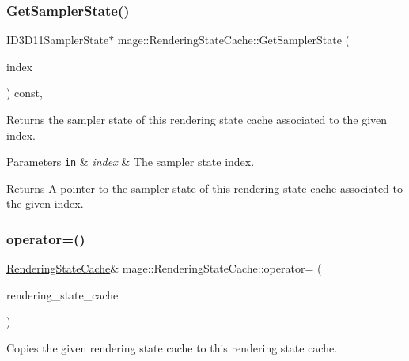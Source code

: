 \subsubsection{\texorpdfstring{Get\+Sampler\+State()}{GetSamplerState()}}
{\footnotesize\ttfamily I\+D3\+D11\+Sampler\+State$\ast$ mage\+::\+Rendering\+State\+Cache\+::\+Get\+Sampler\+State (\begin{DoxyParamCaption}\item[{\hyperlink{structmage_1_1_rendering_state_cache_a4e1d4796699929e0618ff54621910770}{Sampler\+State\+Index}}]{index }\end{DoxyParamCaption}) const\hspace{0.3cm}{\ttfamily [private]}, {\ttfamily [noexcept]}}

Returns the sampler state of this rendering state cache associated to the given index.


\begin{DoxyParams}[1]{Parameters}
\mbox{\tt in}  & {\em index} & The sampler state index. \\
\hline
\end{DoxyParams}
\begin{DoxyReturn}{Returns}
A pointer to the sampler state of this rendering state cache associated to the given index. 
\end{DoxyReturn}
\hypertarget{structmage_1_1_rendering_state_cache_a9534ceabde1d3f9f318f90d2ceec7646}{}\label{structmage_1_1_rendering_state_cache_a9534ceabde1d3f9f318f90d2ceec7646} 
\subsubsection{\texorpdfstring{operator=()}{operator=()}\hspace{0.1cm}{\footnotesize\ttfamily [1/2]}}
{\footnotesize\ttfamily \hyperlink{structmage_1_1_rendering_state_cache}{Rendering\+State\+Cache}\& mage\+::\+Rendering\+State\+Cache\+::operator= (\begin{DoxyParamCaption}\item[{const \hyperlink{structmage_1_1_rendering_state_cache}{Rendering\+State\+Cache} \&}]{rendering\+\_\+state\+\_\+cache }\end{DoxyParamCaption})\hspace{0.3cm}{\ttfamily [delete]}}

Copies the given rendering state cache to this rendering state cache.


